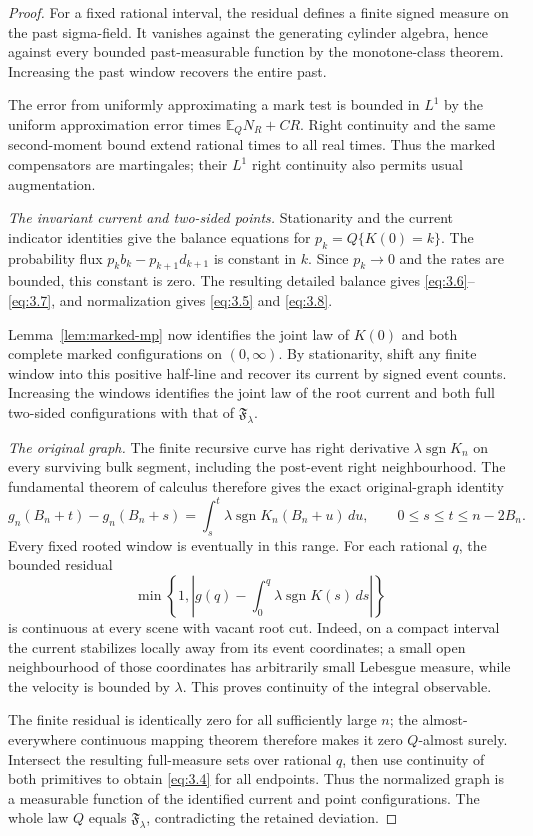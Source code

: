 \documentclass[11pt,reqno]{amsart}
\theoremstyle{definition}
\theoremstyle{remark}
\numberwithin{equation}{section}
\newcommand{\E}{\mathbb E}
\newcommand{\cF}{\mathfrak F}
\newcommand{\sgn}{\operatorname{sgn}}
\begin{document}
\begin{proof}
For a fixed rational interval, the residual
defines a finite signed measure on the past sigma-field.  It vanishes
against the generating cylinder algebra, hence against every bounded
past-measurable function by the monotone-class theorem.  Increasing the
past window recovers the entire past.

The error from uniformly approximating a mark test is bounded in \(L^1\) by
the uniform approximation error times \(\E_QN_R+CR\).
Right continuity and the same second-moment bound extend rational times
to all real times.  Thus the marked compensators are martingales;
their \(L^1\) right continuity also permits usual augmentation.

\emph{The invariant current and two-sided points.}
Stationarity and the current indicator identities give the balance
equations for \(p_k=Q\{K(0)=k\}\).
The probability flux \(p_kb_k-p_{k+1}d_{k+1}\) is constant in \(k\).
Since \(p_k\to0\) and the rates are bounded, this constant is zero.
The resulting detailed balance gives \eqref{eq:3.6}--\eqref{eq:3.7}, and normalization
gives \eqref{eq:3.5} and \eqref{eq:3.8}.

Lemma~\ref{lem:marked-mp} now identifies the
joint law of \(K(0)\) and both complete marked configurations on
\((0,\infty)\).  By stationarity, shift any finite window into this
positive half-line and recover its current by signed event counts.
Increasing the windows identifies the joint law of the root current
and both full two-sided configurations with that of \(\cF_\lambda\).

\emph{The original graph.}
The finite recursive curve has right derivative
\(\lambda\sgn K_n\) on every surviving bulk segment, including the
post-event right neighbourhood.  The fundamental theorem of calculus
therefore gives the exact original-graph identity
\[
g_n(B_n+t)-g_n(B_n+s)
 =\int_s^t\lambda\sgn K_n(B_n+u)\,du,
 \qquad 0\le s\le t\le n-2B_n.
\]
Every fixed rooted window is eventually in this range.  For each
rational \(q\), the bounded residual
\[
\min\left\{1,\left|g(q)-\int_0^q\lambda\sgn K(s)\,ds\right|\right\}
\]
is continuous at every scene with vacant root cut.  Indeed, on a
compact interval the current stabilizes locally away from its event
coordinates; a small open neighbourhood of those coordinates has
arbitrarily small Lebesgue measure, while the velocity is bounded by
\(\lambda\).  This proves continuity of the integral observable.

The finite residual is identically zero for all sufficiently large
\(n\); the almost-everywhere continuous mapping theorem therefore
makes it zero \(Q\)-almost surely.  Intersect the resulting full-measure
sets over rational \(q\), then use continuity of both primitives to
obtain \eqref{eq:3.4} for all endpoints.
Thus the normalized graph is a measurable function of the identified
current and point configurations.  The whole law \(Q\) equals
\(\cF_\lambda\), contradicting the retained deviation.


\end{proof}
\end{document}
